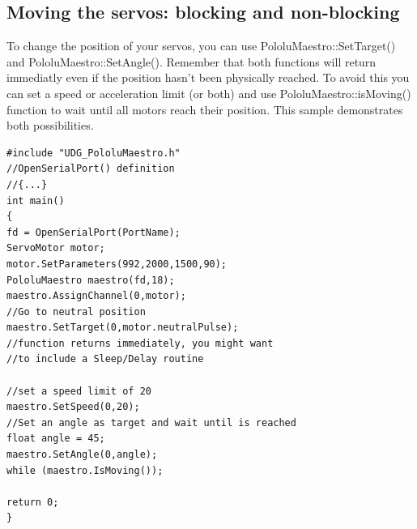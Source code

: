 \documentclass[letterpaper]{book}
\begin{document}
\subsection{Moving the servos: blocking and non-blocking}
To change the position of your servos, you can use PololuMaestro::SetTarget() and PololuMaestro::SetAngle(). Remember that both functions will return immediatly even if the position hasn't been physically reached. To avoid this you can set a speed or acceleration limit (or both) and use PololuMaestro::isMoving() function to wait until all motors reach their position. This sample demonstrates both possibilities.\\
\begin{lstlisting}
#include "UDG_PololuMaestro.h"
//OpenSerialPort() definition
//{...}
int main()
{
fd = OpenSerialPort(PortName);
ServoMotor motor;
motor.SetParameters(992,2000,1500,90);
PololuMaestro maestro(fd,18);
maestro.AssignChannel(0,motor);
//Go to neutral position
maestro.SetTarget(0,motor.neutralPulse);
//function returns immediately, you might want
//to include a Sleep/Delay routine

//set a speed limit of 20
maestro.SetSpeed(0,20);
//Set an angle as target and wait until is reached
float angle = 45;
maestro.SetAngle(0,angle);
while (maestro.IsMoving());

return 0;
}
\end{lstlisting} 
\end{document}
